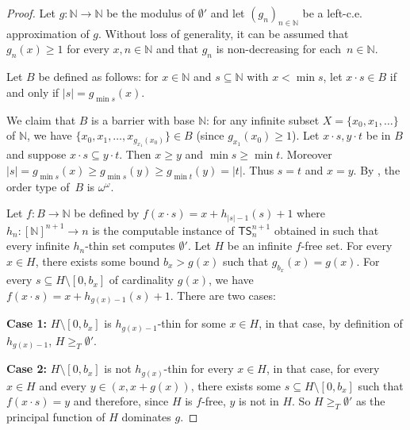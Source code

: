 \documentclass[10pt,a4paper]{article}
\newcommand{\TS}[0]{\mathsf{TS}}
\newcommand{\NN}[0]{\mathbb{N}}
\numberwithin{theorem}{section}
\begin{document}
\begin{proof}
Let $g : \NN \to \NN$ be the modulus of $\emptyset'$ and let $(g_n)_{n \in \NN}$ be a left-c.e. approximation of $g$. Without loss of generality, it can be assumed that $g_{n}(x) \geq 1$ for every $x,n \in \NN$ and that $g_n$ is non-decreasing for each~$n \in \NN$.

Let $B$ be defined as follows: for $x \in \NN$ and $s \subseteq \NN$ with $x < \min s$, let $x \cdot s \in B$ if and only if $|s| = g_{\min s}(x)$. 


We claim that $B$ is a barrier with base $\NN$: for any infinite subset $X = \{x_0, x_1, \dots\}$ of $\NN$, we have $\{x_0, x_1, \dots, x_{g_{x_1}(x_0)}\}\in B$ (since $g_{x_1}(x_0)\geq 1$). Let $x \cdot s, y \cdot t$ be in $B$ and suppose $x\cdot s \subseteq y \cdot t$.
Then $x \geq y$ and $\min s \geq \min t$. Moreover $|s| = g_{\min s}(x) \geq g_{\min s}(y)\geq g_{\min t}(y) = |t|$. Thus $s = t$ and $x=y$. By , the order type of~$B$ is $\omega^{\omega}$.

Let $f : B \to \NN$ be defined by $f(x \cdot s) = x + h_{|s| - 1}(s) + 1$ where $h_n : [\NN]^{n+1} \to n$ is the computable instance of $\TS^{n+1}_n$ obtained in  such that every infinite $h_n$-thin set computes $\emptyset'$. 
Let $H$ be an infinite $f$-free set. For every $x \in H$, there exists some bound $b_x > g(x)$ such that $g_{b_x}(x) = g(x)$. For every $s \subseteq H \setminus [0,b_x]$ of cardinality $g(x)$, we have $f(x \cdot s) = x + h_{g(x) - 1}(s) + 1$. There are two cases:
\smallskip

\textbf{Case 1:} $H \setminus [0,b_x]$ is $h_{g(x) - 1}$-thin for some $x \in H$, in that case, by definition of $h_{g(x) - 1}$, $H \geq_T \emptyset'$.
\smallskip

\textbf{Case 2:} $H \setminus [0,b_x]$ is not $h_{g(x)}$-thin for every $x \in H$, in that case, for every $x \in H$ and every $y \in (x,x + g(x))$, there exists some $s \subseteq H \setminus [0,b_x]$ such that $f(x \cdot s) = y$ and therefore, since $H$ is $f$-free, $y$ is not in $H$. So $H \geq_T \emptyset'$ as the principal function of $H$ dominates $g$.
\end{proof}



\end{document}
